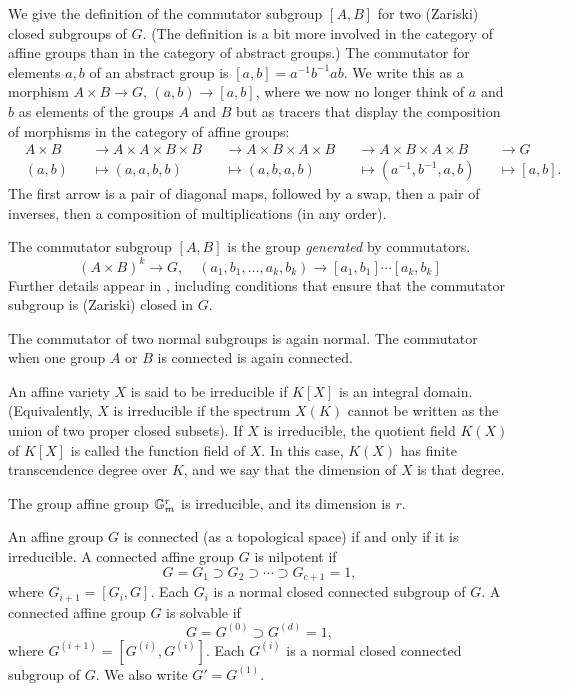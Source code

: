 We give the definition of the commutator subgroup $[A,B]$ for two
(Zariski) closed subgroups of $G$.  (The definition is a bit more
involved in the category of affine groups than in the category of
abstract groups.)  The commutator for elements $a,b$ of an abstract
group is $[a,b] = a^{-1}b^{-1} a b$.  We write this as a morphism
$A\times B \to G$, $(a,b)\to [a,b]$, where we now no longer think
of $a$ and $b$ as elements of the groups $A$ and $B$ but as
tracers that display the composition of morphisms in the category of
affine groups:
\begin{align*}
  &A \times B &&\to A\times A \times B \times B
  &&\to A \times B \times A\times B
  &&\to A \times B \times A\times B  
  &&\to G\\
&(a,b) &&\mapsto (a,a,b,b) &&\mapsto (a,b,a,b) &&\mapsto (a^{-1},b^{-1},a,b) &&\mapsto [a,b].
\end{align*}
The first arrow is a pair of diagonal maps, followed by a swap, then
a pair of inverses, then a composition of multiplications (in any
order).

The commutator subgroup $[A,B]$ is the group {\it generated} by
commutators.
\[
(A\times B)^k \to G,\quad (a_1,b_1,\ldots,a_k,b_k)\to [a_1,b_1]\cdots[a_k,b_k]
\]
Further details appear in \cite{humphreys2012linear}, including
conditions that ensure that the commutator subgroup is (Zariski)
closed in $G$.

The commutator of two normal subgroups is again normal.  The
commutator when one group $A$ or $B$ is connected is again connected.

An affine variety $X$ is said to be irreducible if $K[X]$ is an
integral domain.  (Equivalently, $X$ is irreducible if the spectrum
$X(K)$ cannot be written as the union of two proper closed subsets).
If $X$ is irreducible, the quotient field $K(X)$ of $K[X]$ is called
the function field of $X$.  In this case, $K(X)$ has finite
transcendence degree over $K$, and we say that the dimension of $X$ is
that degree.

The group affine group ${\Bbb G}_m^r$ is irreducible, and its
dimension is $r$.


An affine group $G$ is connected (as a topological space) if and only
if it is irreducible.  A connected affine group $G$ is nilpotent if
\[
G = G_1 \supset G_2 \supset \cdots \supset G_{c+1}=1,
\]
where $G_{i+1} = [G_i,G]$.  Each $G_i$ is a normal closed connected subgroup
of $G$.
A connected affine group $G$ is solvable if
\[
G = G^{(0)} \supset G^{(d)} = 1,
\]
where $G^{(i+1)} = [G^{(i)},G^{(i)}]$.  Each $G^{(i)}$ is a normal closed
connected subgroup of $G$. We also write $G' = G^{(1)}$.

